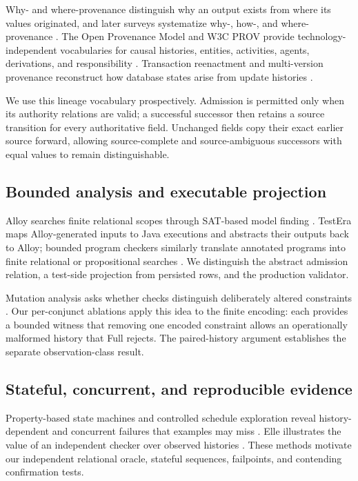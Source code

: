 Why- and where-provenance distinguish why an output exists from where its values originated, and later surveys systematize why-, how-, and where-provenance \citep{buneman2001whywhere,cheney2009provenance}. The Open Provenance Model and W3C PROV provide technology-independent vocabularies for causal histories, entities, activities, agents, derivations, and responsibility \citep{moreau2011opm,moreau2013provdm}. Transaction reenactment and multi-version provenance reconstruct how database states arise from update histories \citep{arab2016rcsi,arab2018reenactment,arab2019thesis}.

We use this lineage vocabulary prospectively. Admission is permitted only when its authority relations are valid; a successful successor then retains a source transition for every authoritative field. Unchanged fields copy their exact earlier source forward, allowing source-complete and source-ambiguous successors with equal values to remain distinguishable.

\subsection{Bounded analysis and executable projection}

Alloy searches finite relational scopes through SAT-based model finding \citep{jackson2002alloy,torlak2007kodkod}. TestEra maps Alloy-generated inputs to Java executions and abstracts their outputs back to Alloy; bounded program checkers similarly translate annotated programs into finite relational or propositional searches \citep{marinov2001testera,dennis2006sat,galeotti2013taco}. We distinguish the abstract admission relation, a test-side projection from persisted rows, and the production validator.

Mutation analysis asks whether checks distinguish deliberately altered constraints \citep{sullivan2017alloymutation,jia2011mutation,just2014mutants}. Our per-conjunct ablations apply this idea to the finite encoding: each provides a bounded witness that removing one encoded constraint allows an operationally malformed history that Full rejects. The paired-history argument establishes the separate observation-class result.

\subsection{Stateful, concurrent, and reproducible evidence}

Property-based state machines and controlled schedule exploration reveal history-dependent and concurrent failures that examples may miss \citep{claessen2000quickcheck,claessen2009pulse,musuvathi2008chess}. Elle illustrates the value of an independent checker over observed histories \citep{kingsbury2020elle}. These methods motivate our independent relational oracle, stateful sequences, failpoints, and contending confirmation tests.


